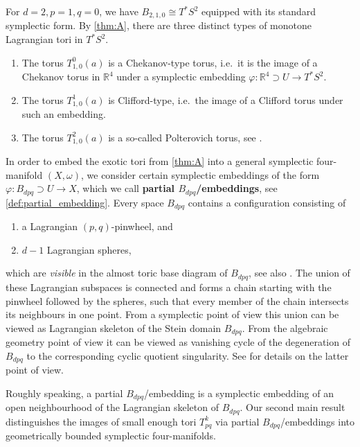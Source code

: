 \documentclass[AIF,Unicode,manuscript]{cedram}
\begin{document}
\begin{example}
    \label{ex:cotangent}
    For $d=2, p=1, q=0$, we have $B_{2,1,0} \cong T^*S^2$ equipped with its standard symplectic form.
By \cref{thm:A}, there are three distinct types of monotone Lagrangian tori in $T^*S^2$. 
    \begin{enumerate}
        \item The torus $T^0_{1,0}(a)$ is a Chekanov-type torus, i.e.\ it is the image of a Chekanov torus in $\mathbb{R}^4$ under a symplectic embedding $\varphi \colon \mathbb{R}^4 \supset U \rightarrow T^*S^2$.
        \item The torus $T^1_{1,0}(a)$ is Clifford-type, i.e.\ the image of a Clifford torus under such an embedding.
        \item The torus $T^2_{1,0}(a)$ is a so-called Polterovich torus, see \cite{AlbFra08}. 
    \end{enumerate} 
\end{example}

In order to embed the exotic tori from \cref{thm:A} into a general symplectic four-manifold $(X,\omega)$, we consider certain symplectic embeddings of the form $\varphi \colon B_{dpq} \supset U \rightarrow X$, which we call \textbf{partial $B_{dpq}$\-/embeddings}, see \cref{def:partial_embedding}. Every space $B_{dpq}$ contains a configuration consisting of 
\begin{enumerate}
    \item a Lagrangian $(p,q)$-pinwheel, and
    \item $d-1$ Lagrangian spheres,
\end{enumerate}
which are \emph{visible} in the almost toric base diagram of $B_{dpq}$, see also \cite[Remark 7.10]{evans2021atfs}.
The union of these Lagrangian subspaces is connected and forms a chain starting with the pinwheel followed by the spheres, such that every member of the chain intersects its neighbours in one point.
From a symplectic point of view this union can be viewed as Lagrangian skeleton of the Stein domain $B_{dpq}$.
From the algebraic geometry point of view it can be viewed as vanishing cycle of the degeneration of $B_{dpq}$ to the corresponding cyclic quotient singularity.
See \cite{Eva19} for details on the latter point of view.

Roughly speaking, a partial $B_{dpq}$\-/embedding is a symplectic embedding of an open neighbourhood of the Lagrangian skeleton of $B_{dpq}$.
Our second main result distinguishes the images of small enough tori $T^k_{pq}$ via partial $B_{dpq}$\-/embeddings into geometrically bounded symplectic four-manifolds. 
\end{document}
